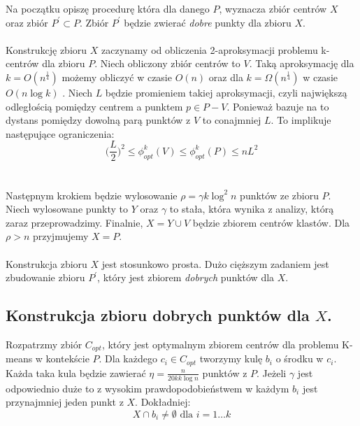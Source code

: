 \noindent
Na początku opiszę procedurę która dla danego $P$, wyznacza zbiór centrów $X$ oraz zbiór $P^{'} \subset P$.
Zbiór $P^{'}$ będzie zwierać \textit{dobre} punkty dla zbioru $X$.
\\~\\
Konstrukcję zbioru $X$ zaczynamy od obliczenia 2-aproksymacji problemu k-centrów dla zbioru $P$.
Niech obliczony zbiór centrów to $V$.
Taką aproksymację dla $k = O(n^{\frac{1}{4}})$ możemy obliczyć w czasie $O(n)$ oraz dla $k = \Omega(n^{\frac{1}{4}})$ w czasie $O(n \log k)$ \cite{10.1145/62212.62255}.
Niech $L$ będzie promieniem takiej aproksymacji, czyli największą odległością pomiędzy centrem a punktem $p \in P-V$.
Ponieważ \cite{10.1145/62212.62255} bazuje na \cite{Gonzalez1985ClusteringTM} to dystans pomiędzy dowolną parą punktów z $V$ to conajmniej $L$.
To implikuje następujące ograniczenia:
\begin{equation}
    \Big( \frac{L}{2 } \Big)^2 \leq \phi_{opt}^{k}(V) \leq \phi_{opt}^{k}(P) \leq nL^{2}
\end{equation} 
\\~\\
Następnym krokiem będzie wylosowanie $\rho = \gamma k \log^{2} n$ punktów ze zbioru $P$.
Niech wylosowane punkty to $Y$ oraz $\gamma$ to stała, która wynika z analizy, którą zaraz przeprowadzimy.
Finalnie, $X = Y \cup V$ będzie zbiorem centrów klastów.
Dla $\rho > n$ przyjmujemy $X = P$.
\\~\\
Konstrukcja zbioru $X$ jest stosunkowo prosta.
Dużo cięższym zadaniem jest zbudowanie zbioru $P^{'}$, który jest zbiorem \textit{dobrych} punktów dla $X$.

\subsection{Konstrukcja zbioru dobrych punktów dla $X$.}

Rozpatrzmy zbiór $C_{opt}$, który jest optymalnym zbiorem centrów dla problemu K-means w kontekście $P$.
Dla każdego $c_{i} \in C_{opt}$ tworzymy kulę $b_{i}$ o środku w $c_{i}$.
Każda taka kula będzie zawierać $\eta = \frac{n}{20kk \log n}$ punktów z $P$.
Jeżeli $\gamma$ jest odpowiednio duże to z wysokim prawdopodobieństwem w każdym $b_{i}$ jest przynajmniej jeden punkt z $X$.
Dokładniej:
\begin{equation}
    X \cap b_{i} \neq \emptyset \text{ dla } i = 1 \dots k
\end{equation}


